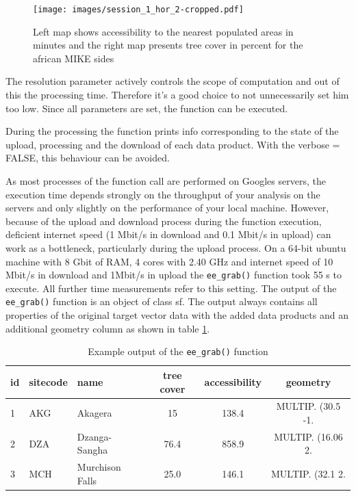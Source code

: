 \begin{center}
	\begin{figure}
		\begin{center}
			\texttt{[image: images/session\_1\_hor\_2-cropped.pdf]}
			\caption{Left map shows accessibility to the nearest populated areas in minutes and the right map presents tree cover in percent for the african MIKE sides}
			\label{sample_session_1}
		\end{center}
	\end{figure}
\end{center}

The resolution parameter actively controls the scope of computation and out of this the processing time. Therefore it's a good choice to not unnecessarily set him too low. 
Since all parameters are set, the function can be executed. 



During the processing the function prints info corresponding to the state of the upload, processing and the download of each data product. With the verbose = FALSE, this behaviour can be avoided. 





As most processes of the function call are performed on Googles servers, the execution time depends strongly on the throughput of your analysis on the servers and only slightly on the performance of your local machine. However, because of the upload and download process during the function execution, deficient internet speed (1 Mbit/s in download and 0.1 Mbit/s in upload) can work as a bottleneck, particularly during the upload process. 
On a 64-bit ubuntu machine with 8 Gbit of RAM, 4 cores with 2.40 GHz and internet speed of 10 Mbit/s in download and 1Mbit/s in upload the \texttt{ee\_grab()} function took 55 s to execute. All further time measurements refer to this setting.
The output of the \texttt{ee\_grab()} function is an object of class sf.  The output always contains all properties of the original target vector data with the added data products and an additional geometry column as shown in table \ref{output}.

\begin{table}[h]
	\begin{tabularx}{\textwidth}{|l|l|l|c|c|c|}
		\hline
		id & sitecode & name & tree cover & accessibility & geometry \\
		\hline
		1  & AKG  & Akagera & 15 & 138.4 & MULTIP. (30.5 -1.\\
		2 & DZA  & Dzanga-Sangha & 76.4 & 858.9 & MULTIP. (16.06 2.\\
		3 & MCH  & Murchison Falls & 25.0 & 146.1 & MULTIP. (32.1 2.\\
		
		\hline
	\end{tabularx}
	\caption{Example output of the \texttt{ee\_grab()} function}
	\label{output}
\end{table}



